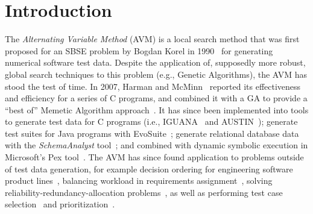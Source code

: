 \documentclass{llncs}
\newcommand{\AVM}{Alternating Variable Method\xspace}
\begin{document}
\section{Introduction}
\vspace{-1em}
The {\it \AVM\/} (AVM) is a local search method that was first proposed for an SBSE problem by Bogdan Korel in 1990~\cite{Korel1990}
for generating \mbox{numerical} software test data.
Despite the application of, supposedly more robust, global search techniques to this problem (e.g., Genetic Algorithms),
the AVM has stood the test of time. In 2007, Harman and McMinn~\cite{Harman2007} reported its effectiveness and
efficiency for a series of C programs, and combined it with a GA to provide a ``best of'' Memetic Algorithm
approach~\cite{Harman2010}. It has since been implemented into tools to generate test data for C programs (i.e.,
IGUANA~\cite{McMinn2007} and AUSTIN~\cite{Lakhotia2010,Lakhotia2013}); generate test suites for Java programs with {\sc
EvoSuite}~\cite{Fraser2013,Fraser2015b}; generate relational database data with the {\it SchemaAnalyst\/} tool~\cite{Kapfhammer2013,McMinn2015}; and combined with dynamic symbolic execution in Microsoft's Pex tool~\cite{Lakhotia2010b}.
The AVM has since found application to problems outside of test data generation, for example
%
decision ordering for engineering software product lines~\cite{Yue2016}, %
%
balancing workload in requirements assignment~\cite{Yue2014}, %
%
solving reliability-redundancy-allocation problems~\cite{Qiu2016}, %
%
as well as performing test case selection~\cite{Pradhan2016} and prioritization~\cite{Arrieta2016}. %
\end{document}
